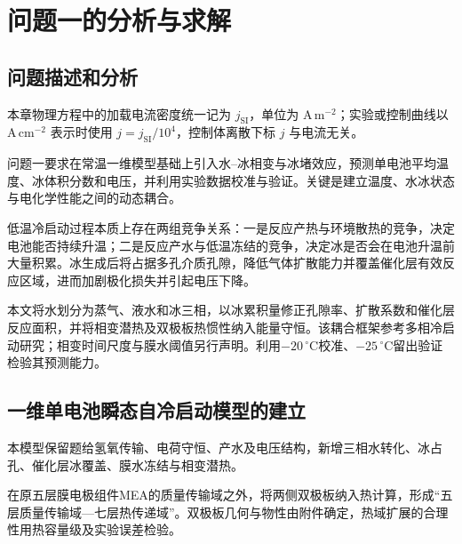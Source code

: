 \documentclass[bwprint]{gmcmthesis}
\numberwithin{equation}{section}
\numberwithin{figure}{section}
\begin{document}
\section{问题一的分析与求解}
\subsection{问题描述和分析}
本章物理方程中的加载电流密度统一记为 $j_{\mathrm{SI}}$，单位为 $\mathrm{A\,m^{-2}}$；实验或控制曲线以 $\mathrm{A\,cm^{-2}}$ 表示时使用 $j=j_{\mathrm{SI}}/10^4$，控制体离散下标 $j$ 与电流无关。

问题一要求在常温一维模型基础上引入水--冰相变与冰堵效应，预测单电池平均温度、冰体积分数和电压，并利用实验数据校准与验证。关键是建立温度、水冰状态与电化学性能之间的动态耦合。

低温冷启动过程本质上存在两组竞争关系：一是反应产热与环境散热的竞争，决定电池能否持续升温；二是反应产水与低温冻结的竞争，决定冰是否会在电池升温前大量积累。冰生成后将占据多孔介质孔隙，降低气体扩散能力并覆盖催化层有效反应区域，进而加剧极化损失并引起电压下降。

本文将水划分为蒸气、液水和冰三相，以冰累积量修正孔隙率、扩散系数和催化层反应面积，并将相变潜热及双极板热惯性纳入能量守恒。该耦合框架参考多相冷启动研究\cite{mao2007}；相变时间尺度与膜水阈值另行声明。利用$-20\,^\circ\mathrm C$校准、$-25\,^\circ\mathrm C$留出验证检验其预测能力。


\subsection{一维单电池瞬态自冷启动模型的建立}
本模型保留题给氢氧传输、电荷守恒、产水及电压结构，新增三相水转化、冰占孔、催化层冰覆盖、膜水冻结与相变潜热。

在原五层膜电极组件MEA的质量传输域之外，将两侧双极板纳入热计算，形成“五层质量传输域—七层热传递域”。双极板几何与物性由附件确定，热域扩展的合理性用热容量级及实验误差检验。
\end{document}
